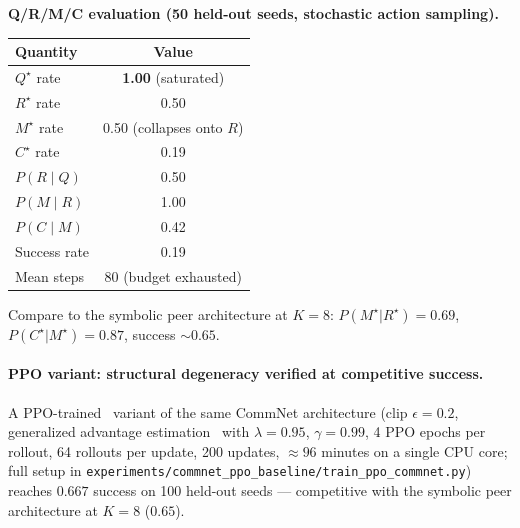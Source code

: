 \documentclass{article}
\begin{document}
\textbf{Q/R/M/C evaluation (50 held-out seeds, stochastic action sampling).}

\begin{table}[h]
\centering
\small
\begin{tabular}{l c}
\toprule
Quantity & Value \\
\midrule
$Q^\star$ rate                              & \textbf{1.00} (saturated) \\
$R^\star$ rate                              & 0.50 \\
$M^\star$ rate                              & 0.50 (collapses onto $R$) \\
$C^\star$ rate                              & 0.19 \\
$P(R \mid Q)$                               & 0.50 \\
$P(M \mid R)$                               & 1.00 \\
$P(C \mid M)$                               & 0.42 \\
Success rate                                & 0.19 \\
Mean steps                                  & 80 (budget exhausted) \\
\bottomrule
\end{tabular}
\end{table}

Compare to the symbolic peer architecture at $K{=}8$: $P(M^\star|R^\star){=}0.69$, $P(C^\star|M^\star){=}0.87$, success $\sim 0.65$.

\paragraph{PPO variant: structural degeneracy verified at competitive success.}
A PPO-trained~\citep{schulman2017proximal} variant of the same CommNet architecture (clip $\epsilon{=}0.2$, generalized advantage estimation~\citep{schulman2016gae} with $\lambda{=}0.95$, $\gamma{=}0.99$, 4 PPO epochs per rollout, 64 rollouts per update, 200 updates, $\approx 96$ minutes on a single CPU core; full setup in \texttt{experiments/commnet\_ppo\_baseline/train\_ppo\_commnet.py}) reaches $0.667$ success on 100 held-out seeds --- competitive with the symbolic peer architecture at $K{=}8$ ($0.65$).
\end{document}
